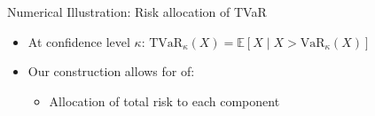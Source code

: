 \documentclass[11pt,xcolor={dvipsnames},hyperref={pdftex,pdfpagemode=UseNone,hidelinks,pdfdisplaydoctitle=true},usepdftitle=false]{beamer}
\begin{document}
\begin{frame}{Numerical Illustration: Risk allocation of TVaR}
\begin{itemize}
    \item At confidence level $\kappa$: $\text{TVaR}_{\kappa}(X) = \mathbb{E}[X \mid X > \text{VaR}_{\kappa}(X)]$    
    \item Our construction allows for  of:
    \begin{itemize}
        \item Allocation of total risk to each component
    \end{itemize}
\end{itemize}
\begin{center}
{}
\vspace{-0.5cm}

\end{center}
\end{frame}
\end{document}
